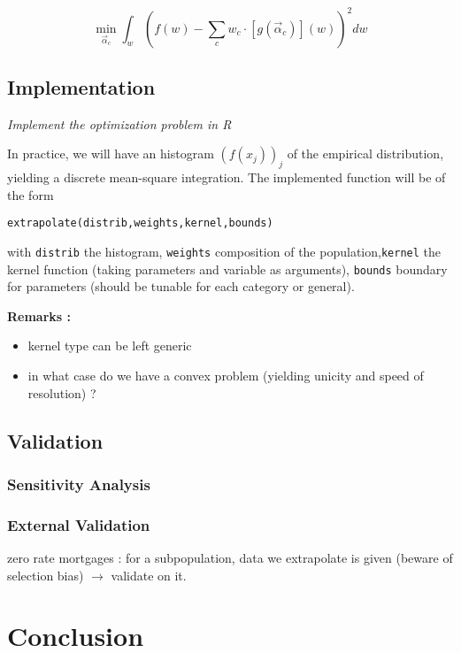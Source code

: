 \[
\min_{\vec{\alpha}_c} \int_w \left(f(w) - \sum_c w_c \cdot \left[ g(\vec{\alpha}_c)\right] (w) \right)^2 dw
\]


\subsection{Implementation}

\textit{Implement the optimization problem in R}

In practice, we will have an histogram $\left(f(x_j)\right)_j$ of the empirical distribution, yielding a discrete mean-square integration. The implemented function will be of the form

\texttt{extrapolate(distrib,weights,kernel,bounds)}

with \texttt{distrib} the histogram, \texttt{weights} composition of the population,\texttt{kernel} the kernel function (taking parameters and variable as arguments), \texttt{bounds} boundary for parameters (should be tunable for each category or general).

\medskip

\textbf{Remarks :}
\begin{itemize}
\item kernel type can be left generic
\item in what case do we have a convex problem (yielding unicity and speed of resolution) ?
\end{itemize}


\subsection{Validation}

\subsubsection{Sensitivity Analysis}



\subsubsection{External Validation}

zero rate mortgages : for a subpopulation, data we extrapolate is given (beware of selection bias) $\rightarrow$ validate on it.





\section{Conclusion}



